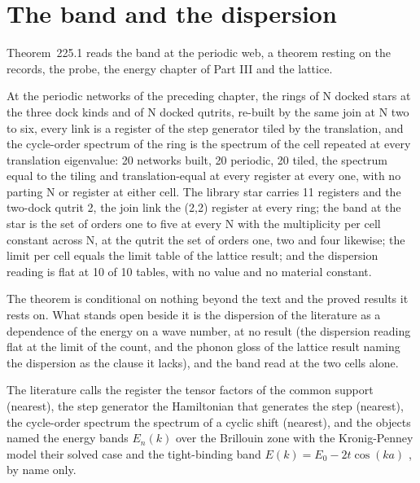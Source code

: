 \par\medskip{}\label{narr:close:12-1}\par
\section{The band and the dispersion}\label{mod:XII-2-band-and-the-dispersion}
\label{narr:open:12-2}Theorem~225.1 reads the band at the periodic web, a theorem resting on the records, the probe, the energy chapter of Part III and the lattice.
\begin{chtheorem}\label{box:XII-2-band-and-the-dispersion:1}
At the periodic networks of the preceding chapter, the rings of N docked stars at the three dock kinds and of N docked qutrits, re-built by the same join at N two to six, every link is a register of the step generator tiled by the translation, and the cycle-order spectrum of the ring is the spectrum of the cell repeated at every translation eigenvalue: 20 networks built, 20 periodic, 20 tiled, the spectrum equal to the tiling and translation-equal at every register at every one, with no parting N or register at either cell. The library star carries 11 registers and the two-dock qutrit 2, the join link the (2,2) register at every ring; the band at the star is the set of orders one to five at every N with the multiplicity per cell constant across N, at the qutrit the set of orders one, two and four likewise; the limit per cell equals the limit table of the lattice result; and the dispersion reading is flat at 10 of 10 tables, with no value and no material constant.
\end{chtheorem}
The theorem is conditional on nothing beyond the text and the proved results it rests on. What stands open beside it is the dispersion of the literature as a dependence of the energy on a wave number, at no result (the dispersion reading flat at the limit of the count, and the phonon gloss of the lattice result naming the dispersion as the clause it lacks), and the band read at the two cells alone.
\begin{chbridge}
The literature calls the register the tensor factors of the common support (nearest), the step generator the Hamiltonian that generates the step (nearest), the cycle-order spectrum the spectrum of a cyclic shift (nearest), and the objects named the energy bands $E_n(k)$ over the Brillouin zone with the Kronig-Penney model their solved case \cite{Bloch1929,KronigPenney1931} and the tight-binding band $E(k) = E_0 - 2t\cos(ka)$ \cite{AshcroftMermin1976}, by name only.
\end{chbridge}
